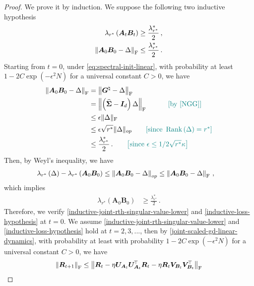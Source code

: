 \begin{proof}
We prove it by induction.
We suppose the following two inductive hypothesis
\begin{align}
    \lambda_{r^*}\left(\bm A_t \bm B_t\right) & \geq \frac{\lambda^*_{r^*}}{2}\,,\label{inductive-joint-rth-singular-value-lower}\\
    \left\|\bm A_0 \bm B_0 - \Delta\right\|_{\rm F} & \leq \frac{\lambda^*_{r^*}}{2}\,.\label{inductive-loss-hypothesis}
\end{align}
Starting from $t=0$, under \eqref{eq:spectral-init-linear}, with probability at least $1- 2C\exp(- \epsilon^2 N)$ for a universal constant $C>0$, we have
\begin{align*}
    \left\|\bm A_0 \bm B_0 - \Delta\right\|_{\rm F} & = \left\|\bm G^\natural - \Delta\right\|_{\rm F}\\
    & = \left\|\left(\widehat{\bm \Sigma}-\bm I_d\right)\Delta\right\|_{\rm F} \quad \tag*{\color{teal}[by \cref{NGG}]}\\
    & \leq \epsilon \|\Delta\|_{\rm F}\\
    & \leq \epsilon \sqrt{r^*} \|\Delta\|_{op}\tag*{\color{teal}$\left[\text{since }\operatorname{Rank}\left(\Delta\right)=r^*\right]$}\\
    & \leq \frac{\lambda^*_{r^*}}{2}\,. \tag*{\color{teal}$\left[\text{since }\epsilon\leq1/2\sqrt{r^*}\kappa\right]$}
\end{align*}
Then, by Weyl's inequality, we have
\begin{align*}
    \lambda_{r^*}\left(\Delta\right)-\lambda_{r^*}\left(\bm A_0 \bm B_0\right) & \leq \left\|\bm A_0 \bm B_0 - \Delta\right\|_{op} \leq \left\|\bm A_0 \bm B_0 - \Delta\right\|_{\rm F}\,,
\end{align*}
which implies
\begin{align}
\label{joint-rth-singular-value-lower}
    \lambda_{r^*}\left(\bm A_0 \bm B_0\right) & \geq \frac{\lambda^*_{r^*}}{2}\,.
\end{align}
Therefore, we verify \cref{inductive-joint-rth-singular-value-lower} and \cref{inductive-loss-hypothesis} at $t=0$. We assume \cref{inductive-joint-rth-singular-value-lower} and \cref{inductive-loss-hypothesis} hold at $t=2,3,...$, then by \cref{joint-scaled-gd-linear-dynamics}, with probability at least with probability $1- 2C\exp(-\epsilon^2 N)$ for a universal constant $C>0$, we have
    \begin{align*}
        \left\|\bm R_{t+1}\right\|_{\rm F} & \leq \left\|\bm R_t - \eta \bm U_{\bm A_t} \bm U_{\bm A_t}^{\!\top}\bm R_t - \eta \bm R_t\bm V_{\bm B_t} \bm V_{\bm B_t}^{\!\top}\right\|_{\rm F}\\

\end{align*}
\end{proof}
